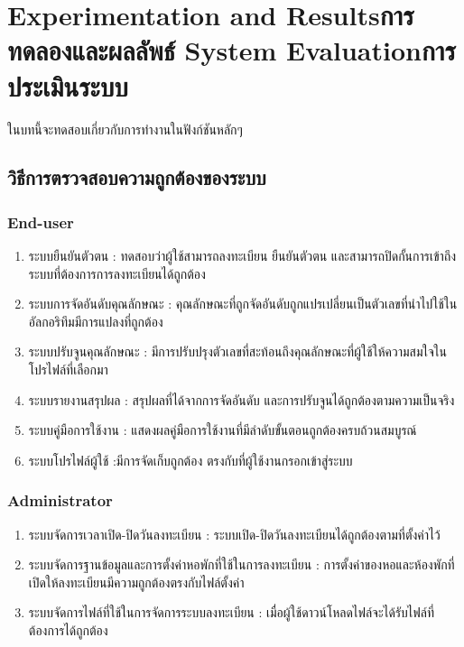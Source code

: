 \chapter{\ifproject%
\ifenglish Experimentation and Results\else การทดลองและผลลัพธ์\fi
\else%
\ifenglish System Evaluation\else การประเมินระบบ\fi
\fi}

ในบทนี้จะทดสอบเกี่ยวกับการทำงานในฟังก์ชันหลักๆ

\section{วิธีการตรวจสอบความถูกต้องของระบบ}
\subsection{End-user}
\begin{enumerate}
    \item ระบบยืนยันตัวตน : ทดสอบว่าผู้ใช้สามารถลงทะเบียน ยืนยันตัวตน และสามารถปิดกั้นการเข้าถึงระบบที่ต้องการการลงทะเบียนได้ถูกต้อง
    \item ระบบการจัดอันดับคุณลักษณะ : คุณลักษณะที่ถูกจัดอันดับถูกแปรเปลี่ยนเป็นตัวเลขที่นำไปใช้ในอัลกอริทึมมีการแปลงที่ถูกต้อง
    \item ระบบปรับจูนคุณลักษณะ : มีการปรับปรุงตัวเลขที่สะท้อนถึงคุณลักษณะที่ผู้ใช้ให้ความสมใจในโปรไฟล์ที่เลือกมา
    \item ระบบรายงานสรุปผล : สรุปผลที่ได้จากการจัดอันดับ และการปรับจูนได้ถูกต้องตามความเป็นจริง
    \item ระบบคู่มือการใช้งาน : แสดงผลคู่มือการใช้งานที่มีลำดับขั้นตอนถูกต้องครบถ้วนสมบูรณ์
    \item ระบบโปรไฟล์ผู้ใช้ :มีการจัดเก็บถูกต้อง ตรงกับที่ผู้ใช้งานกรอกเข้าสู่ระบบ
\end{enumerate}
\subsection{Administrator}
\begin{enumerate}
    \item ระบบจัดการเวลาเปิด-ปิดวันลงทะเบียน : ระบบเปิด-ปิดวันลงทะเบียนได้ถูกต้องตามที่ตั้งค่าไว้
    \item ระบบจัดการฐานข้อมูลและการตั้งค่าหอพักที่ใช้ในการลงทะเบียน : การตั้งค่าของหอและห้องพักที่เปิดให้ลงทะเบียนมีความถูกต้องตรงกับไฟล์ตั้งค่า
    \item ระบบจัดการไฟล์ที่ใช้ในการจัดการระบบลงทะเบียน : เมื่อผู้ใช้ดาวน์โหลดไฟล์จะได้รับไฟล์ที่ต้องการได้ถูกต้อง
\end{enumerate}
